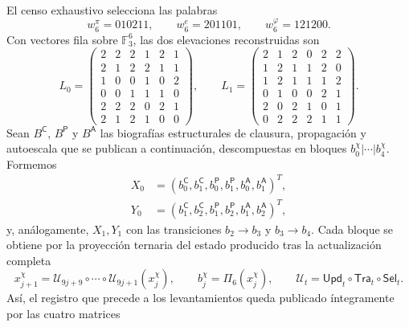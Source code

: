 El censo exhaustivo selecciona las palabras
\[
 w_6^\pi=010211,\qquad
 w_6^e=201101,\qquad
 w_6^\varphi=121200.
\]
Con vectores fila sobre \(\mathbb F_3^6\), las dos elevaciones reconstruidas
son
\[
L_0=
\begin{pmatrix}
2&2&2&1&2&1\\
2&1&2&2&1&1\\
1&0&0&1&0&2\\
0&0&1&1&1&0\\
2&2&2&0&2&1\\
2&1&2&1&0&0
\end{pmatrix},
\qquad
L_1=
\begin{pmatrix}
2&1&2&0&2&2\\
1&2&1&1&2&0\\
1&2&1&1&1&2\\
0&1&0&0&2&1\\
2&0&2&1&0&1\\
0&2&2&2&1&1
\end{pmatrix}.
\]
Sean \(B^{\mathsf C}\), \(B^{\mathsf P}\) y \(B^{\mathsf A}\) las
biografías estructurales de clausura, propagación y autoescala que se
publican a continuación, descompuestas en bloques
\(b_0^\chi|\cdots|b_4^\chi\). Formemos
\[
 \begin{aligned}
 X_0&=(b_0^{\mathsf C},b_1^{\mathsf C},
       b_0^{\mathsf P},b_1^{\mathsf P},
       b_0^{\mathsf A},b_1^{\mathsf A})^T,\\
 Y_0&=(b_1^{\mathsf C},b_2^{\mathsf C},
       b_1^{\mathsf P},b_2^{\mathsf P},
       b_1^{\mathsf A},b_2^{\mathsf A})^T,
 \end{aligned}
\]
y, análogamente, \(X_1,Y_1\) con las transiciones
\(b_2\to b_3\) y \(b_3\to b_4\). Cada bloque se obtiene por la proyección
ternaria del estado producido tras la actualización completa
\[
 x_{j+1}^{\chi}
 =\mathcal U_{9j+9}\circ\cdots\circ\mathcal U_{9j+1}(x_j^{\chi}),
 \qquad
 b_j^{\chi}=\Pi_6(x_j^{\chi}),
 \qquad
 \mathcal U_t=\mathsf{Upd}_t\circ\mathsf{Tra}_t\circ\mathsf{Sel}_t.
\]
Así, el registro que precede a los levantamientos queda publicado
íntegramente por las cuatro matrices
\begingroup\scriptsize
